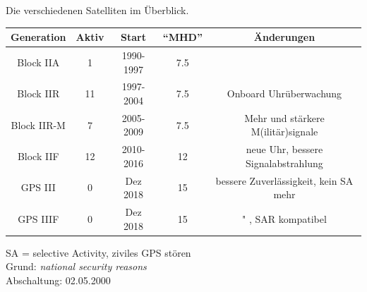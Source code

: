 \begin{frame}{Die verschiedenen Satelliten im Überblick.}
    \begin{table}
        \begin{tabular}{c S[table-format=2.0] c S[table-format=2.1] c}
            \toprule
            {Generation} & {Aktiv} & {Start} & {\enquote{MHD}} & {Änderungen} \\
            \midrule
            Block IIA   &  1 & 1990-1997 & 7.5 & \\
            Block IIR   & 11 & 1997-2004 & 7.5 & Onboard Uhrüberwachung \\
            Block IIR-M &  7 & 2005-2009 & 7.5 & Mehr und stärkere M(ilitär)signale \\
            Block IIF   & 12 & 2010-2016 & 12  & neue Uhr, bessere Signalabstrahlung \\
            GPS III     &  0 & Dez 2018  & 15  & bessere Zuverlässigkeit, kein SA mehr \\
            GPS IIIF    &  0 & Dez 2018  & 15  & " , SAR kompatibel \\
            \bottomrule
        \end{tabular}
    \end{table}
    SA = selective Activity, ziviles GPS stören\\
    Grund: \textit{national security reasons}\\
    Abschaltung: 02.05.2000
\end{frame}

